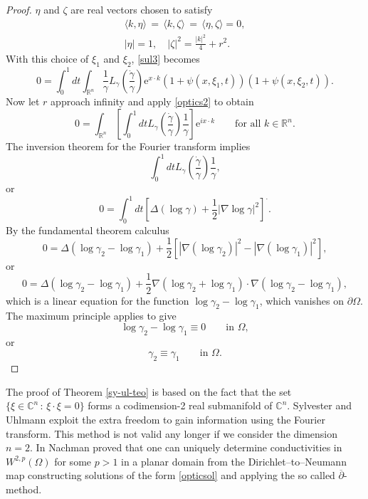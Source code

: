 \documentclass[10pt, a4paper, twoside, openright]{book}
\theoremstyle{definition}
\theoremstyle{plain}
\theoremstyle{plain}
\theoremstyle{plain}
\theoremstyle{plain}
\theoremstyle{plain}
\theoremstyle{plain}
\theoremstyle{plain}
\theoremstyle{plain}
\begin{document}
\begin{proof}
$\eta$ and $\zeta$ are real vectors chosen to satisfy
\begin{align*}
\langle k,\eta\rangle\,=\,\langle k,\zeta \rangle \,=\,\langle \eta,\zeta\rangle=0,\\
|\eta|=1,\quad|\zeta|^2=\frac{|k|^2}{4}+r^2.
\end{align*}
With this choice of $\xi_1$ and $\xi_2$, \eqref{sul3} becomes
$$0=\int_0^1dt\int_{\mathbb{R}^n}\frac{1}{\gamma}
L_{\gamma}\left(\frac{\dot{\gamma}}{\gamma}\right)
\mathrm{e}^{x\cdot k}(1+\psi(x,\xi_1,t))
(1+\psi(x,\xi_2,t)).$$
Now let $r$ approach infinity and apply \eqref{optics2} to obtain
$$0=\int_{\mathbb{R}^n}\left[\int_0^1dtL_{\gamma}\left(\frac{\dot{\gamma}}{\gamma}\right)
\frac{1}{\gamma}
\right]\mathrm{e}^{ix\cdot k}\qquad\textrm{for all }k\in\mathbb{R}^n.$$
The inversion theorem for the Fourier transform implies
$$\int_0^1dtL_{\gamma}\left(\frac{\dot{\gamma}}{\gamma}\right)
\frac{1}{\gamma},$$
or
$$0=\int_0^1dt[\Delta(\log\gamma)+\frac{1}{2}|\nabla\log\gamma|^2]^{\bm{\cdot}}.$$
By the fundamental theorem calculus
$$0=\Delta(\log\gamma_2-\log\gamma_1)+\frac{1}{2}
\left[|\nabla(\log\gamma_2)|^2-|\nabla(\log\gamma_1)|^2\right],$$
or
$$0=\Delta(\log\gamma_2-\log\gamma_1)+\frac{1}{2}\nabla
(\log\gamma_2+\log\gamma_1)\cdot\nabla(\log\gamma_2-\log\gamma_1),$$
which is a linear equation for the function $\log\gamma_2-\log\gamma_1$, which vanishes
on $\partial\Omega$. The maximum principle applies to give
$$\log\gamma_2-\log\gamma_1\equiv0\qquad\textrm{in }\Omega,$$
or
$$\gamma_2\equiv\gamma_1\qquad\textrm{in }\Omega.$$
\end{proof}


The proof of Theorem \ref{sy-ul-teo} is based on the fact that
the set $\{\xi\in\mathbb{C}^n\,:\,\xi\cdot\xi=0\}$
forms a codimension-2 real submanifold of $\mathbb{C}^n$.
Sylvester and Uhlmann exploit the extra freedom to gain information
using the Fourier transform.
This method is not valid any longer if we consider the dimension $n=2$.
In \cite{Na96} Nachman proved that one can uniquely determine conductivities
in $W^{2,p}(\Omega)$ for some $p>1$ in a planar domain from
the Dirichlet--to--Neumann map constructing solutions of the
form \eqref{opticsol} and applying the so called
$\overline{\partial}$-method.
\end{document}
